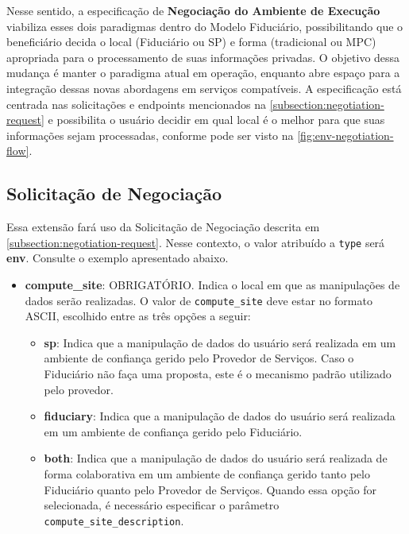 Nesse sentido, a especificação de \textbf{Negociação do Ambiente de Execução} viabiliza esses dois paradigmas dentro do Modelo Fiduciário, possibilitando que o beneficiário decida o local (Fiduciário ou \acs{SP}) e forma (tradicional ou \acs{MPC}) apropriada para o processamento de suas informações privadas. O objetivo dessa mudança é manter o paradigma atual em operação, enquanto abre espaço para a integração dessas novas abordagens em serviços compatíveis. A especificação está centrada nas solicitações e endpoints mencionados na \autoref{subsection:negotiation-request} e possibilita o usuário decidir em qual local é o melhor para que suas informações sejam processadas, conforme pode ser visto na \autoref{fig:env-negotiation-flow}.



\subsection{Solicitação de Negociação}

Essa extensão fará uso da Solicitação de Negociação descrita em \autoref{subsection:negotiation-request}. Nesse contexto, o valor atribuído a \texttt{type} será \textbf{env}. Consulte o exemplo apresentado abaixo.



\begin{itemize}

    \item \textbf{compute\_site}: OBRIGATÓRIO. Indica o local em que as manipulações de dados serão realizadas. O valor de \texttt{compute\_site} deve estar no formato ASCII, escolhido entre as três opções a seguir:

    \begin{itemize}
    
        \item \textbf{sp}: Indica que a manipulação de dados do usuário será realizada em um ambiente de confiança gerido pelo Provedor de Serviços. Caso o Fiduciário não faça uma proposta, este é o mecanismo padrão utilizado pelo provedor.
        
        \item \textbf{fiduciary}: Indica que a manipulação de dados do usuário será realizada em um ambiente de confiança gerido pelo Fiduciário.
        
        \item \textbf{both}: Indica que a manipulação de dados do usuário será realizada de forma colaborativa em um ambiente de confiança gerido tanto pelo Fiduciário quanto pelo Provedor de Serviços. Quando essa opção for selecionada, é necessário especificar o parâmetro \texttt{compute\_site\_description}.
   
    \end{itemize}

\end{itemize}


